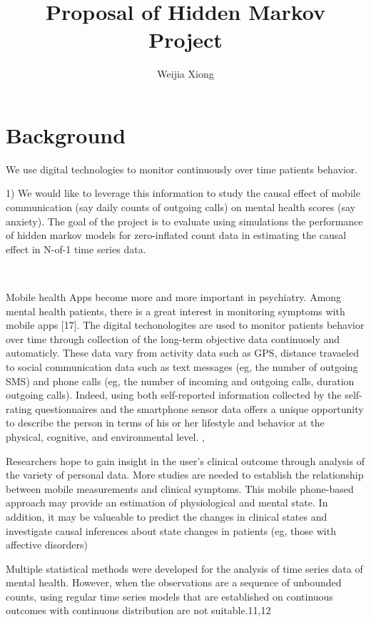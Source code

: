 \documentclass[12pt]{article}
\numberwithin{equation}{section}
\begin{document}
	\title{Proposal of Hidden Markov Project}
	
	\author[$\star$]{Weijia Xiong}


\section{Background}



We use digital technologies to monitor continuously over time patients behavior. 

1) We would like to leverage this information to study the causal effect of mobile communication (say daily counts of outgoing calls) on mental health scores (say anxiety). The goal of the project is to evaluate using simulations the performance of hidden markov models for zero-inflated count data in estimating the causal effect in N-of-1 time series data.

\


Mobile health Apps become more and more important in psychiatry. Among mental health patients, there is a great interest in monitoring symptoms with mobile apps [17].  
The digital techonologites are used to monitor patients behavior over time through collection of the long-term objective data continuosly and automaticly. These data vary from activity data such as GPS, distance travaeled to social communication data such as text messages (eg, the number of outgoing SMS) and phone calls (eg, the number of incoming and outgoing calls, duration outgoing calls). 
Indeed, using both self-reported information collected by the self-rating questionnaires and the smartphone sensor data offers a unique opportunity to describe the person in terms of his or her lifestyle and behavior at the physical, cognitive, and environmental level. \citet{cornet2018systematic}, \citet{torous2018characterizing} 

Researchers hope to gain insight in the user’s clinical outcome through analysis of the variety of personal data. More studies are needed to establish the relationship between mobile  measurements and clinical symptoms. This mobile phone-based approach may provide an estimation of physiological and mental state. In addition, it may be valueable to predict the changes in clinical states and investigate causal inferences about state changes in patients (eg, those with affective disorders)\citet{dogan2017smartphone}


Multiple statistical methods were developed for the analysis of time series data of mental health. However, when the observations are a sequence of unbounded counts, using regular time series models that are established on continuous outcomes with continuous distribution are not suitable.11,12 
\end{document}
